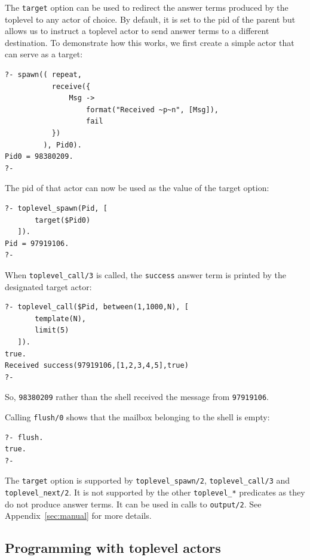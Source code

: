 The \texttt{target} option can be used to redirect the answer terms produced by the toplevel to any actor of choice. By default, it is set to the pid of the parent but allows us to instruct a toplevel actor to send answer terms to a different destination. To demonstrate how this works, we first create a simple actor that can serve as a target:

\begin{verbatim}
?- spawn(( repeat,
           receive({
               Msg -> 
                   format("Received ~p~n", [Msg]), 
                   fail
           })
         ), Pid0).
Pid0 = 98380209.
?-
\end{verbatim}

\noindent The pid of that actor can now be used as the value of the target option:

\begin{verbatim}
?- toplevel_spawn(Pid, [
       target($Pid0)
   ]).
Pid = 97919106.
?-
\end{verbatim}

\noindent When \texttt{toplevel\_call/3} is called, the \texttt{success} answer term is printed by the designated target actor:

\begin{verbatim}
?- toplevel_call($Pid, between(1,1000,N), [
       template(N),
       limit(5)
   ]).
true.
Received success(97919106,[1,2,3,4,5],true)
?-
\end{verbatim}

\noindent So, \texttt{98380209} rather than the shell received the message from \texttt{97919106}.

Calling \texttt{flush/0} shows that the mailbox belonging to the shell is empty:

\begin{verbatim}
?- flush.
true.
?-
\end{verbatim}

\noindent The \texttt{target} option is supported by \texttt{toplevel\_spawn/2}, \texttt{toplevel\_call/3} and \texttt{toplevel\_next/2}. It is not supported by the other \texttt{toplevel\_*} predicates as they do not produce answer terms. It can be used in calls to \texttt{output/2}. See Appendix~\ref{sec:manual} for more details.

\subsection{Programming with toplevel actors}\label{sec:programming-with-toplevels}

